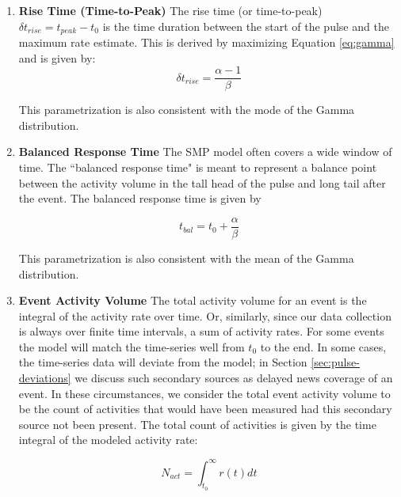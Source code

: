 \documentclass{article}
\begin{document}
\begin{enumerate}


\item{ \textbf{Rise Time (Time-to-Peak)} } 
The rise time (or time-to-peak) $\delta t_{rise} = t_{peak} - t_0$ is the time duration between the start of the pulse and the maximum rate estimate. This is derived by maximizing Equation \ref{eq:gamma} and is given by:
\begin{equation}
\delta t_{rise} = \frac{ \alpha - 1 } { \beta } 
\label{eq:rise}
\end{equation}

This parametrization is also consistent with the mode of the Gamma distribution.\cite{wiki:gamma} 



\item{ \textbf{Balanced Response Time} }  
The SMP model often covers a wide window of time. The ``balanced response time" is meant to represent a balance point between the activity volume in the tall head of the pulse and long tail after the event. The balanced response time is given by

\begin{equation}
t_{bal} = t_0 + \frac{\alpha}{\beta}
\label{eq:bal}
\end{equation}

This parametrization is also consistent with the mean of the Gamma distribution.\cite{wiki:gamma} 



\item{ \textbf{Event Activity Volume} } 
The total activity volume for an event is the integral of the activity rate over time. Or, similarly, since our data collection is always over finite time intervals, a sum of activity rates. For some events the model will match the time-series well from $t_0$ to the end. In some cases, the time-series data will deviate from the model; in Section \ref{sec:pulse-deviations} we discuss such secondary sources as delayed news coverage of an event. In these circumstances, we consider the total event activity volume to be the count of activities that would have been measured had this secondary source not been present. The total count of activities is given by the time integral of the modeled activity rate: 

\begin{equation}
N_{act} = \int_{t_0}^\infty r(t) dt 
\label{eq:total-acs}
\end{equation}

\end{enumerate}
\end{document}
